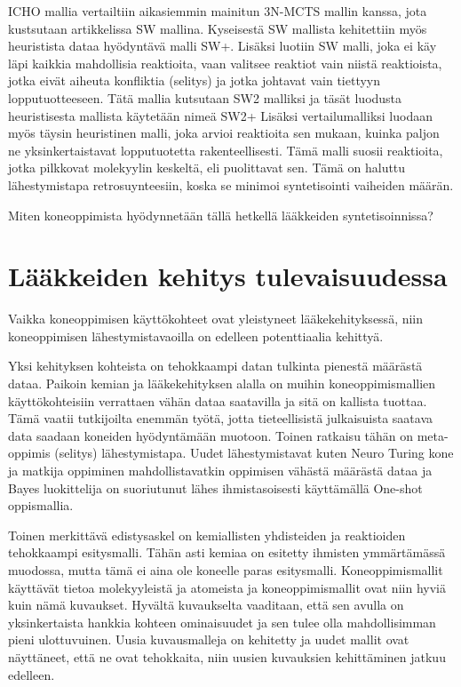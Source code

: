 \documentclass[finnish,twoside,censored,subject,sw-line]{HYthesisML}
\begin{document}
ICHO mallia vertailtiin aikasiemmin mainitun 3N-MCTS mallin kanssa, jota kustsutaan artikkelissa SW mallina.
Kyseisestä SW mallista kehitettiin myös heuristista dataa hyödyntävä malli SW+.
Lisäksi luotiin SW malli, joka ei käy läpi kaikkia mahdollisia reaktioita, vaan valitsee reaktiot vain niistä reaktioista, jotka eivät aiheuta konfliktia (selitys) ja jotka johtavat vain tiettyyn lopputuotteeseen.
Tätä mallia kutsutaan SW2 malliksi ja täsät luodusta heuristisesta mallista käytetään nimeä SW2+
Lisäksi vertailumalliksi luodaan myös täysin heuristinen malli, joka arvioi reaktioita sen mukaan, kuinka paljon ne yksinkertaistavat lopputuotetta rakenteellisesti.
Tämä malli suosii reaktioita, jotka pilkkovat molekyylin keskeltä, eli puolittavat sen.
Tämä on haluttu lähestymistapa retrosuynteesiin, koska se minimoi syntetisointi vaiheiden määrän.


Miten koneoppimista hyödynnetään tällä hetkellä lääkkeiden syntetisoinnissa?~\cite{SeglerMarwinHS2018Pcsw,ShaharHarelAndKiraRadinsky,ShinBonggun}

\chapter{Lääkkeiden kehitys tulevaisuudessa}

Vaikka koneoppimisen käyttökohteet ovat yleistyneet lääkekehityksessä, niin koneoppimisen lähestymistavaoilla on edelleen potenttiaalia kehittyä.~\cite{ButlerKeithT2018Mlfm}

Yksi kehityksen kohteista on tehokkaampi datan tulkinta pienestä määrästä dataa.
Paikoin kemian ja lääkekehityksen alalla on muihin koneoppimismallien käyttökohteisiin verrattaen vähän dataa saatavilla ja sitä on kallista tuottaa.
Tämä vaatii tutkijoilta enemmän työtä, jotta tieteellisistä julkaisuista saatava data saadaan koneiden hyödyntämään muotoon.
Toinen ratkaisu tähän on meta-oppimis (selitys) lähestymistapa.
Uudet lähestymistavat kuten Neuro Turing kone ja matkija oppiminen mahdollistavatkin oppimisen vähästä määrästä dataa ja Bayes luokittelija on suoriutunut lähes ihmistasoisesti käyttämällä One-shot oppismallia.

Toinen merkittävä edistysaskel on kemiallisten yhdisteiden ja reaktioiden tehokkaampi esitysmalli.
Tähän asti kemiaa on esitetty ihmisten ymmärtämässä muodossa, mutta tämä ei aina ole koneelle paras esitysmalli.
Koneoppimismallit käyttävät tietoa molekyyleistä ja atomeista ja koneoppimismallit ovat niin hyviä kuin nämä kuvaukset.
Hyvältä kuvaukselta vaaditaan, että sen avulla on yksinkertaista hankkia kohteen ominaisuudet ja sen tulee olla mahdollisimman pieni ulottuvuinen.
Uusia kuvausmalleja on kehitetty ja uudet mallit ovat näyttäneet, että ne ovat tehokkaita, niin uusien kuvauksien kehittäminen jatkuu edelleen.
\end{document}
